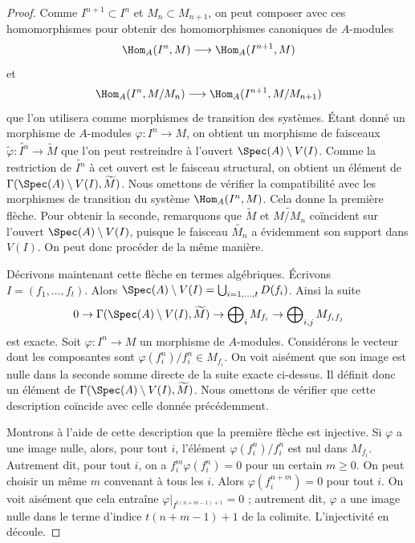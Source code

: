 \begin{proof}
Comme $I^{n + 1} \subset I^n$ et $M_n \subset M_{n + 1}$, on peut
composer avec ces homomorphismes pour obtenir des homomorphismes canoniques de $A$-modules
$$
\Hom_A(I^n, M)
\longrightarrow
\Hom_A(I^{n + 1}, M)
$$
et
$$
\Hom_A(I^n, M/M_n)
\longrightarrow
\Hom_A(I^{n + 1}, M/M_{n + 1})
$$
que l'on utilisera comme morphismes de transition des systèmes. Étant donné un morphisme de
$A$-modules $\varphi : I^n \to M$, on obtient un morphisme de
faisceaux $\widetilde{\varphi} : \widetilde{I^n} \to \widetilde{M}$
que l'on peut restreindre à l'ouvert $\Spec(A) \setminus V(I)$.
Comme la restriction de $\widetilde{I^n}$ à cet ouvert est le faisceau structural,
on obtient un élément de
$\Gamma(\Spec(A) \setminus V(I), \widetilde{M})$.
Nous omettons de vérifier la compatibilité avec les morphismes de
transition du système $\Hom_A(I^n, M)$. Cela donne la première flèche.
Pour obtenir la seconde, remarquons que
$\widetilde{M}$ et $\widetilde{M/M_n}$ coïncident sur l'ouvert
$\Spec(A) \setminus V(I)$, puisque le faisceau $\widetilde{M_n}$
a évidemment son support dans $V(I)$. On peut donc procéder de la même
manière.

\medskip\noindent
Décrivons maintenant cette flèche en termes algébriques.
Écrivons $I = (f_1, \ldots, f_t)$. Alors
$\Spec(A) \setminus V(I) = \bigcup_{i = 1, \ldots, t} D(f_i)$.
Ainsi la suite
$$
0 \to
\Gamma(\Spec(A) \setminus V(I), \widetilde{M}) \to
\bigoplus\nolimits_i M_{f_i} \to
\bigoplus\nolimits_{i, j} M_{f_if_j}
$$
est exacte. Soit $\varphi : I^n \to M$ un morphisme de $A$-modules.
Considérons le vecteur dont les composantes sont $\varphi(f_i^n)/f_i^n \in M_{f_i}$.
On voit aisément que son image est nulle dans la seconde
somme directe de la suite exacte ci-dessus. Il définit donc un élément
de $\Gamma(\Spec(A) \setminus V(I), \widetilde{M})$.
Nous omettons de vérifier que cette description coïncide avec celle donnée
précédemment.

\medskip\noindent
Montrons à l'aide de cette description que la première flèche est
injective. Si $\varphi$ a une image nulle, alors, pour tout $i$, l'élément
$\varphi(f_i^n)/f_i^n$ est nul dans $M_{f_i}$. Autrement
dit, pour tout $i$, on a $f_i^m\varphi(f_i^n) = 0$ pour un certain $m \geq 0$.
On peut choisir un même $m$ convenant à tous les $i$. Alors
$\varphi(f_i^{n + m}) = 0$ pour tout $i$. On voit aisément que
cela entraîne $\varphi|_{I^{t(n + m - 1) + 1}} = 0$ ;
autrement dit, $\varphi$ a une image nulle dans le terme d'indice $t(n + m - 1) + 1$ de
la colimite. L'injectivité en découle.


\end{proof}
